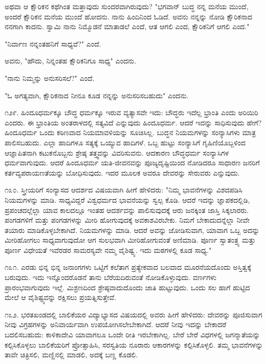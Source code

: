 ಅಥವಾ ಆ ಕ್ಷೌರಿಕನ ಕಥೆಗಿಂತ ಮತ್ತಾವುದು ಸುಂದರವಾಗಿರುವುದು? "ಭಗವಾನ್ ಬುದ್ಧ ನನ್ನ ಮನೆಯ ಮುಂದೆ, ಅಂದರೆ ಕ್ಷೌರಿಕನ ಮನೆಯ ಮುಂದೆ ಹೋದನು. ನಾನು ಹಿಂದಿನಿಂದ ಓಡಿದೆ. ಅವನು ನನ್ನನ್ನು ನೋಡಿ ಕ್ಷೌರಿಕನಾದ ನನಗಾಗಿ ಕಾದನು. ಸ್ವಾಮಿ ನಾನು ನಿಮ್ಮೊಡನೆ ಮಾತಾಡಲೆ ಎಂದೆ, ಆತ ಆಗಲಿ ಎಂದ, ಕ್ಷೌರಿಕನಿಗೆ ಆಗಲಿ ಎಂದ."

"ನಿರ್ವಾಣ ನನ್ನಂತಹನಿಗೆ ಸಾಧ್ಯವೆ?" ಎಂದೆ.

ಅವನು, "ಹೌದು, ನಿನ್ನಂತಹ ಕ್ಷೌರಿಕನಿಗೂ ಸಾಧ್ಯ" ಎಂದನು.

"ನಾನು ನಿಮ್ಮನ್ನು ಅನುಸರಿಸಲೆ?" ಎಂದೆ.

"ಓ ಅಗತ್ಯವಾಗಿ, ಕ್ಷೌರಿಕನಾದ ನೀನೂ ಕೂಡ ನನ್ನನ್ನು ಅನುಸರಿಸಬಹುದು" ಎಂದನು.

೧೨೯. ಹಿಂದೂಧರ್ಮಕ್ಕೂ ಬೌದ್ಧ ಧರ್ಮಕ್ಕೂ ಇರುವ ವ್ಯತ್ಯಾಸವೇ ಇದು: ಬೌದ್ಧರು ಇದೆಲ್ಲ ಭ್ರಾಂತಿ ಎಂದು ಅರಿಯಿರಿ ಎಂದರು. ಈ ಭ್ರಾಂತಿಯ ಅಂತರಾಳದಲ್ಲಿ ಸತ್ಯವಿದೆ ಎನ್ನುವುದು ಹಿಂದೂಧರ್ಮ. ಆದರೆ ಇದನ್ನು ಸಾಧಿಸುವುದು ಹೇಗೆ? ಹಿಂದೂಧರ್ಮ ಒಂದು ಕಠಿಣವಾದ ನಿಯಮಾವಳಿಯನ್ನು ಸೂಚಿಸಿಲ್ಲ. ಬುದ್ಧನ ನಿಯಮಗಳನ್ನು ಸಂನ್ಯಾಸಿಗಳು ಮಾತ್ರ ಪಾಲಿಸಬಹುದು. ಎಲ್ಲಾ ಹಾದಿಗಳೂ ಸತ್ಯಕ್ಕೆ ಒಯ್ಯುವ ಹಾದಿಗಳೆ. ಒಬ್ಬ ಹುಟ್ಟು ಸಂನ್ಯಾಸಿಗೆ ಗೃಹಿಣಿಯೊಬ್ಬಳಿಂದ ಆಜ್ಞಾಪಿತನಾಗಿ ಕಟುಕನೊಬ್ಬನು ಶ್ರೇಷ್ಠ ತತ್ತ್ವವನ್ನು ವಿವರಿಸುವನು. ಆದಕಾರಣ ಬೌದ್ಧಧರ್ಮ ಸಂನ್ಯಾಸಿಗಳ ಧರ್ಮವಾಗುವುದು. ಆದರೆ ಹಿಂದೂಧರ್ಮ ಯತಿ-ಜೀವನವನ್ನು ಪೂಜ್ಯದೃಷ್ಟಿಯಿಂದ ನೋಡಿದರೂ ಸಾಧಾರಣ ಜನರಿಗೆ ಕರ್ತವ್ಯಪರಾಯಣತೆಯನ್ನು ಬೋಧಿಸುವುದು. ಇದರ ಮೂಲಕ ಅವರೂ ದೇವರನ್ನು ಸೇರುವರು ಎನ್ನುವುದು.

೧೩೦. ಸ್ತ್ರೀಯರಿಗೆ ಸಂನ್ಯಾಸದ ಆದರ್ಶದ ವಿಷಯವಾಗಿ ಹೀಗೆ ಹೇಳಿದರು: "ನಿಮ್ಮ ಭಾವನೆಗಳನ್ನು ವಿಶದಪಡಿಸಿ ನಿಯಮಗಳನ್ನು ಮಾಡಿ. ಸಾಧ್ಯವಿದ್ದರೆ ವಿಶ್ವಧರ್ಮದ ಭಾವನೆಯನ್ನು ಸ್ವಲ್ಪ ಕೊಡಿ. ಆದರೆ ಇದನ್ನು ಜ್ಞಾಪಕದಲ್ಲಿಡಿ, ಪ್ರಪಂಚದಲ್ಲೆಲ್ಲಾ ಯಾವ ಕಾಲದಲ್ಲೂ ಇಂತಹ ಆದರ್ಶವನ್ನು ಪಾಲಿಸುವುದಕ್ಕೆ ಆರು ಜನಕ್ಕಿಂತ ಜಾಸ್ತಿ ಸಿಕ್ಕಲಾರರು. ಪಂಗಡಗಳಿಗೆ ಮತ್ತು ಪಂಗಡಗಳನ್ನು ಮೀರಿ ಹೋಗುವುದಕ್ಕೆ ಅವಕಾಶವಿರಬೇಕು. ನಿಮಗೆ ಬೇಕಾದುದನ್ನೆಲ್ಲಾ ನೀವೇ ತಯಾರು ಮಾಡಿಕೊಳ್ಳಬೇಕಾಗಿದೆ. ನಿಯಮಗಳನ್ನು ಮಾಡಿ. ಆದರೆ ಅವನ್ನು ಜೋಡಿಸುವಾಗ, ಯಾವಾಗ ಒಬ್ಬ ಅದನ್ನು ಮೀರಿಹೋಗಲು ಸಾಧ್ಯವಾಗುವುದೋ ಆಗ ಸುಲಭವಾಗಿ ಮೀರಿಹೋಗುವಂತೆ ಅಣಿಮಾಡಿ. ಪೂರ್ಣ ಸ್ವಾತಂತ್ರ್ಯ ಮತ್ತು ಪೂರ್ಣ ವಿಧೇಯತೆ ಇವೆರಡರ ಸಾಮರಸ್ಯವೇ ನಮ್ಮ ವೈಶಿಷ್ಟ್ಯ. ಇದು ಮಠಗಳಲ್ಲಿ ಕೂಡ ಸಾಧ್ಯ."

೧೩೧. ಎರಡು ಭಿನ್ನ ಭಿನ್ನ ಜನಾಂಗಗಳು ಒಟ್ಟಿಗೆ ಕಲೆತಾಗ ಪ್ರತ್ಯೇಕವಾದ ಬಲವಾದ ಮೂರನೆಯದೊಂದು ಅಸ್ತಿತ್ವಕ್ಕೆ ಬರುವುದು. ಇದು ಇನ್ನೊಂದರೊಡನೆ ತಾನು ಬೆರೆಯದಿರುವಂತೆ ನೋಡಿಕೊಳ್ಳುವುದು. ವರ್ಣಗಳು ಪ್ರಾರಂಭವಾಗುವುದು ಇಲ್ಲೆ. ಮಿಶ್ರಣದಿಂದ ಶ್ರೇಷ್ಠವಾದುದೊಂದು ಜಾತಿ ಹುಟ್ಟುವುದು. ಒಂದು ಸಲ ಹಾಗೆ ಹುಟ್ಟಿದ ಮೇಲೆ ಆ ವೈಶಿಷ್ಟ್ಯವನ್ನು ರಕ್ಷಿಸಲು ಪ್ರಯತ್ನಿಸುತ್ತೇವೆ.

೧೩೨. ಭರತಖಂಡದಲ್ಲಿ ಬಾಲಿಕೆಯರ ವಿದ್ಯಾಭ್ಯಾಸದ ವಿಷಯದಲ್ಲಿ ಅವರು ಹೀಗೆ ಹೇಳಿದರು: ದೇವರನ್ನು ಪೂಜಿಸುವಾಗ ನೀವು ವಿಗ್ರಹಗಳನ್ನು ಅನಿವಾರ್ಯವಾಗಿ ಉಪಯೋಗಿಸಲೇಬೇಕಾಗಿದೆ. ಆದರೆ ನೀವು ಇದನ್ನು ಬೇಕಾದರೆ ಬದಲಿಸಬಹುದು: ಕಾಳಿಕಾದೇವಿ ಯಾವಾಗಲೂ ಒಂದೇ ರೀತಿ ಇರಬೇಕಾಗಿಲ್ಲ. ಬೇರೆ ಬೇರೆ ವಿಧಗಳಲ್ಲಿ ಜಗನ್ಮಾತೆಯನ್ನು ಕಲ್ಪಿಸಿಕೊಳ್ಳಲು ಬಾಲಿಕೆಯರಿಗೆ ಪ್ರೋತ್ಸಾಹಿಸಿ, ಸರಸ್ವತಿಯ ನೂರಾರು ಆಕಾರಗಳನ್ನು ಕಲ್ಪಿಸಿಕೊಳ್ಳಲಿ. ತಮ್ಮ ಭಾವನೆಗಳನ್ನು ತಾವೇ ಚಿತ್ರಿಸಲಿ, ಮಣ್ಣಿನಲ್ಲಿ ಮಾಡಲಿ, ಅದಕ್ಕೆ ಬಣ್ಣ ಕೊಡಲಿ.

